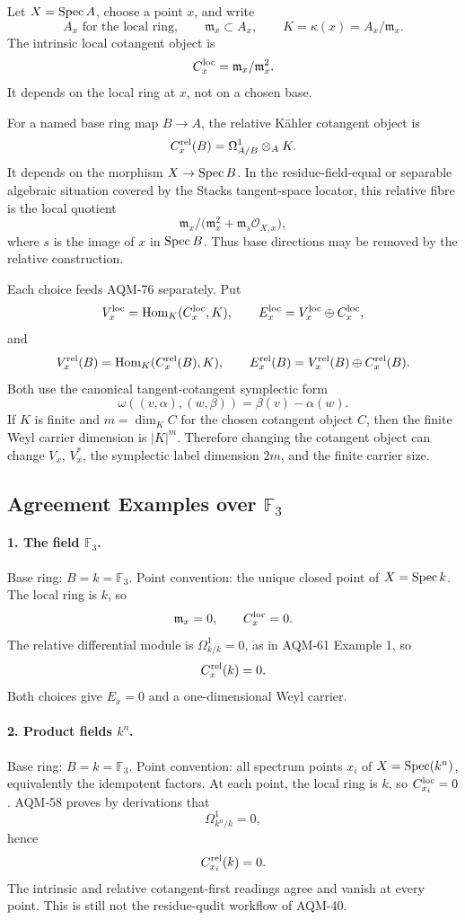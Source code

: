 Let \(X=\operatorname{Spec} A\), choose a point \(x\), and write
\[
  A_x \text{ for the local ring},\qquad
  \mathfrak m_x\subset A_x,\qquad
  K=\kappa(x)=A_x/\mathfrak m_x .
\]
The intrinsic local cotangent object is
\[
  C_x^{\rm loc}=\mathfrak m_x/\mathfrak m_x^2 .
\]
It depends on the local ring at \(x\), not on a chosen base.

For a named base ring map \(B\to A\), the relative K\"ahler cotangent object is
\[
  C_x^{\rm rel}(B)=\Omega^1_{A/B}\otimes_AK .
\]
It depends on the morphism \(X\to\operatorname{Spec} B\).  In the residue-field-equal or
separable algebraic situation covered by the Stacks tangent-space locator,
this relative fibre is the local quotient
\[
  \mathfrak m_x/
  \bigl(\mathfrak m_x^2+\mathfrak m_s\mathcal O_{X,x}\bigr),
\]
where \(s\) is the image of \(x\) in \(\operatorname{Spec} B\).  Thus base directions may be
removed by the relative construction.

Each choice feeds AQM-76 separately.  Put
\[
  V_x^{\rm loc}=\operatorname{Hom}_K(C_x^{\rm loc},K),\qquad
  E_x^{\rm loc}=V_x^{\rm loc}\oplus C_x^{\rm loc},
\]
and
\[
  V_x^{\rm rel}(B)=\operatorname{Hom}_K(C_x^{\rm rel}(B),K),\qquad
  E_x^{\rm rel}(B)=V_x^{\rm rel}(B)\oplus C_x^{\rm rel}(B).
\]
Both use the canonical tangent-cotangent symplectic form
\[
  \omega((v,\alpha),(w,\beta))=\beta(v)-\alpha(w).
\]
If \(K\) is finite and \(m=\dim_K C\) for the chosen cotangent object \(C\),
then the finite Weyl carrier dimension is \(|K|^m\).  Therefore changing the
cotangent object can change \(V_x\), \(V_x^*\), the symplectic label dimension
\(2m\), and the finite carrier size.

\subsection{Agreement Examples over \texorpdfstring{\(\mathbb F_3\)}{F3}}

\paragraph{1. The field \(\mathbb F_3\).}
Base ring: \(B=k=\mathbb F_3\).  Point convention: the unique closed point of
\(X=\operatorname{Spec} k\).  The local ring is \(k\), so
\[
  \mathfrak m_x=0,\qquad C_x^{\rm loc}=0.
\]
The relative differential module is \(\Omega^1_{k/k}=0\), as in AQM-61
Example 1, so
\[
  C_x^{\rm rel}(k)=0.
\]
Both choices give \(E_x=0\) and a one-dimensional Weyl carrier.

\paragraph{2. Product fields \(k^n\).}
Base ring: \(B=k=\mathbb F_3\).  Point convention: all spectrum points
\(x_i\) of \(X=\operatorname{Spec}(k^n)\), equivalently the idempotent factors.  At each
point, the local ring is \(k\), so \(C_{x_i}^{\rm loc}=0\).  AQM-58 proves by
derivations that
\[
  \Omega^1_{k^n/k}=0,
\]
hence
\[
  C_{x_i}^{\rm rel}(k)=0.
\]
The intrinsic and relative cotangent-first readings agree and vanish at every
point.  This is still not the residue-qudit workflow of AQM-40.

